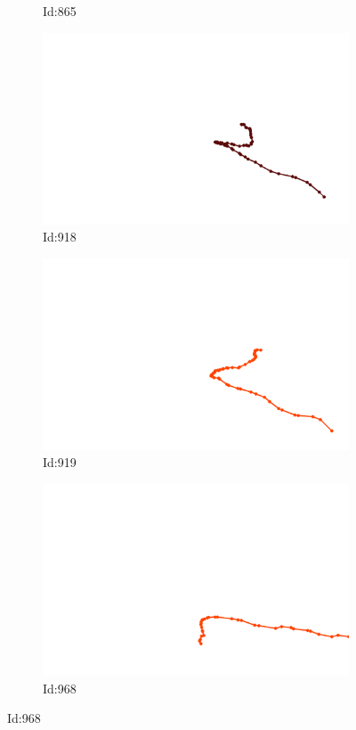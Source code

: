 \documentclass[12pt,twoside]{report}
\begin{document}
\begin{figure}
\begin{subfigure}[b]{0.20\textwidth}
\caption{Id:865}
\end{subfigure}
\begin{subfigure}[b]{0.20\textwidth}
\centering
\includegraphics[width=\textwidth]{../trajectories/918.png}
\caption{Id:918}
\end{subfigure}
\begin{subfigure}[b]{0.20\textwidth}
\centering
\includegraphics[width=\textwidth]{../trajectories/919.png}
\caption{Id:919}
\end{subfigure}
\begin{subfigure}[b]{0.20\textwidth}
\centering
\includegraphics[width=\textwidth]{../trajectories/968.png}
\caption{Id:968}
\end{subfigure}
\end{figure}
\end{document}
